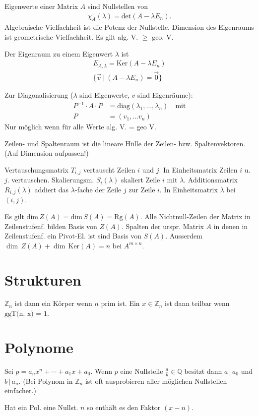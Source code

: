 \documentclass{article}
\begin{document}
\begin{multicols}{2}
Eigenwerte einer Matrix $A$ sind Nullstellen von
\begin{align*}
    \chi_A(\lambda) = \text{det}(A - \lambda E_n).
\end{align*}
Algebraische Vielfachheit ist die Potenz der Nullstelle. Dimension des Eigenraums ist geometrische Vielfachheit. Es gilt alg. V. $\geq$ geo. V.

Der Eigenraum zu einem Eigenwert $\lambda$ ist
\begin{align*}
    E_{A,\lambda} = \text{Ker}(A - \lambda E_n) \\
    \{ \vec{v}\ |\ (A - \lambda E_n) = \vec{0} \}
\end{align*}

Zur Diagonalisierung ($\lambda$ sind Eigenwerte, $v$ sind Eigenräume):
\begin{align*}
    P^{-1} \cdot A \cdot P &= \text{diag}(\lambda_1, \ldots, \lambda_n) \quad \text{mit} \\ 
    P &= (v_1, \ldots v_n)
\end{align*}
Nur möglich wenn für alle Werte alg. V. = geo V.

Zeilen- und Spaltenraum ist die lineare Hülle der Zeilen- bzw. Spaltenvektoren. (Auf Dimension aufpassen!)

Vertauschungsmatrix $T_{i,j}$ vertauscht Zeilen $i$ und $j$. In Einheitsmatrix Zeilen $i$ u. $j.$ vertauschen. Skalierungsm. $S_i(\lambda)$ skaliert Zeile $i$ mit $\lambda$. Additionsmatrix $R_{i,j}(\lambda)$ addiert das $\lambda$-fache der Zeile $j$ zur Zeile $i$. In Einheitsmatrix $\lambda$ bei $(i, j)$.

Es gilt $\text{dim}\,Z(A) = \text{dim}\,S(A) = \text{Rg}(A)$. Alle Nichtnull-Zeilen der Matrix in Zeilenstufenf. bilden Basis von $Z(A)$. Spalten der urspr. Matrix $A$ in denen in Zeilenstufenf. ein Pivot-El. ist sind Basis von $S(A)$. Ausserdem $\dim\,Z(A) + \dim\,\text{Ker}(A) = n$ bei $A^{m \times n}$.

\section*{Strukturen}

$\mathbb{Z}_n$ ist dann ein Körper wenn $n$ prim ist. Ein $x \in \mathbb{Z}_n$ ist dann teilbar wenn $\text{ggT(n, x) = 1}$.

\section*{Polynome}

Sei $p = a_nx^n + \cdots + a_1x + a_0$. Wenn $p$ eine Nullstelle $\frac{a}{b} \in \mathbb{Q}$ besitzt dann $a\,|\,a_0$ und $b\,|\,a_n$. (Bei Polynom in $\mathbb{Z}_n$ ist oft ausprobieren aller möglichen Nullstellen einfacher.) 

Hat ein Pol. eine Nullst. $n$ so enthält es den Faktor $(x - n)$. 

\end{multicols}
\end{document}

